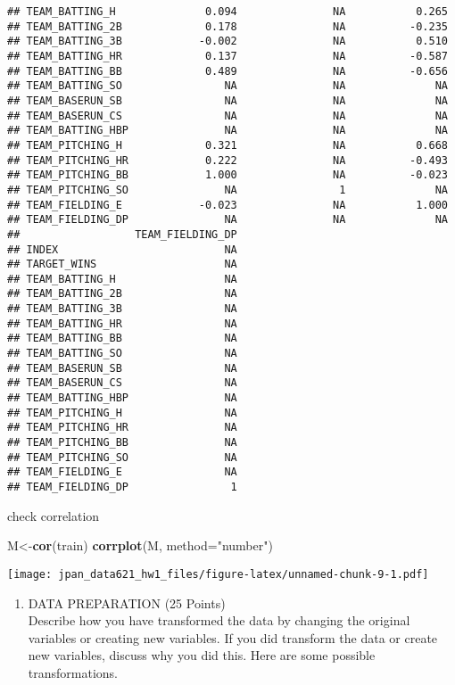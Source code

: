 \documentclass[]{article}
\newenvironment{Shaded}{\begin{snugshade}}{\end{snugshade}}
\newcommand{\KeywordTok}[1]{\textcolor[rgb]{0.13,0.29,0.53}{\textbf{#1}}}
\newcommand{\DataTypeTok}[1]{\textcolor[rgb]{0.13,0.29,0.53}{#1}}
\newcommand{\StringTok}[1]{\textcolor[rgb]{0.31,0.60,0.02}{#1}}
\newcommand{\NormalTok}[1]{#1}
\providecommand{\tightlist}{%
  \setlength{\itemsep}{0pt}\setlength{\parskip}{0pt}}
\begin{document}
\begin{verbatim}
## TEAM_BATTING_H              0.094               NA           0.265
## TEAM_BATTING_2B             0.178               NA          -0.235
## TEAM_BATTING_3B            -0.002               NA           0.510
## TEAM_BATTING_HR             0.137               NA          -0.587
## TEAM_BATTING_BB             0.489               NA          -0.656
## TEAM_BATTING_SO                NA               NA              NA
## TEAM_BASERUN_SB                NA               NA              NA
## TEAM_BASERUN_CS                NA               NA              NA
## TEAM_BATTING_HBP               NA               NA              NA
## TEAM_PITCHING_H             0.321               NA           0.668
## TEAM_PITCHING_HR            0.222               NA          -0.493
## TEAM_PITCHING_BB            1.000               NA          -0.023
## TEAM_PITCHING_SO               NA                1              NA
## TEAM_FIELDING_E            -0.023               NA           1.000
## TEAM_FIELDING_DP               NA               NA              NA
##                  TEAM_FIELDING_DP
## INDEX                          NA
## TARGET_WINS                    NA
## TEAM_BATTING_H                 NA
## TEAM_BATTING_2B                NA
## TEAM_BATTING_3B                NA
## TEAM_BATTING_HR                NA
## TEAM_BATTING_BB                NA
## TEAM_BATTING_SO                NA
## TEAM_BASERUN_SB                NA
## TEAM_BASERUN_CS                NA
## TEAM_BATTING_HBP               NA
## TEAM_PITCHING_H                NA
## TEAM_PITCHING_HR               NA
## TEAM_PITCHING_BB               NA
## TEAM_PITCHING_SO               NA
## TEAM_FIELDING_E                NA
## TEAM_FIELDING_DP                1
\end{verbatim}

check correlation

\begin{Shaded}
\begin{Highlighting}[]
\NormalTok{M<-}\KeywordTok{cor}\NormalTok{(train)}
\KeywordTok{corrplot}\NormalTok{(M, }\DataTypeTok{method=}\StringTok{"number"}\NormalTok{)}
\end{Highlighting}
\end{Shaded}

\texttt{[image: jpan\_data621\_hw1\_files/figure-latex/unnamed-chunk-9-1.pdf]}

\begin{enumerate}
\def\labelenumi{\arabic{enumi}.}
\setcounter{enumi}{1}
\tightlist
\item
  DATA PREPARATION (25 Points)\\
  Describe how you have transformed the data by changing the original
  variables or creating new variables. If you did transform the data or
  create new variables, discuss why you did this. Here are some possible
  transformations.\\
\end{enumerate}
\end{document}

